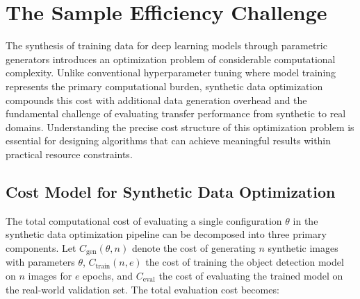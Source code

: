 

\begin{abstract}
The optimization of synthetic data generation parameters for object detection models presents a fundamentally challenging sample efficiency problem. Each evaluation of a candidate parameter configuration requires generating synthetic images, training a deep neural network such as YOLO, and evaluating performance on real-world validation data. This computational pipeline renders traditional reinforcement learning approaches, which typically require millions of environment interactions, entirely impractical. This chapter develops a comprehensive framework for sample-efficient optimization in this expensive black-box setting, introducing multi-fidelity techniques, adaptive budget allocation strategies, and principled convergence detection methods that collectively enable effective optimization within strict computational constraints.
\end{abstract}

\section{The Sample Efficiency Challenge}
\label{sec:sample_efficiency_challenge}

The synthesis of training data for deep learning models through parametric generators introduces an optimization problem of considerable computational complexity. Unlike conventional hyperparameter tuning where model training represents the primary computational burden, synthetic data optimization compounds this cost with additional data generation overhead and the fundamental challenge of evaluating transfer performance from synthetic to real domains. Understanding the precise cost structure of this optimization problem is essential for designing algorithms that can achieve meaningful results within practical resource constraints.

\subsection{Cost Model for Synthetic Data Optimization}
\label{subsec:cost_model}

The total computational cost of evaluating a single configuration $\theta$ in the synthetic data optimization pipeline can be decomposed into three primary components. Let $C_{\text{gen}}(\theta, n)$ denote the cost of generating $n$ synthetic images with parameters $\theta$, $C_{\text{train}}(n, e)$ the cost of training the object detection model on $n$ images for $e$ epochs, and $C_{\text{eval}}$ the cost of evaluating the trained model on the real-world validation set. The total evaluation cost becomes:

